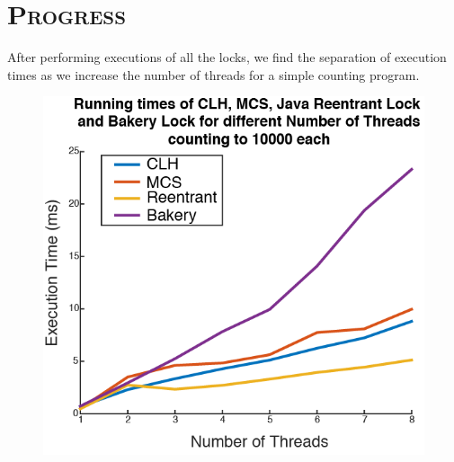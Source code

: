 \documentclass[CheckpointReport.tex]{subfiles}
\begin{document}
\bigskip

\section*{\textsc{\Large Progress}}
After performing executions of all the locks, we find the separation of execution times as we increase the number of threads for a simple counting program.
\begin{figure}[H]
	\centering
	\includegraphics[]{runningTime.png}
\end{figure}
\end{document}
